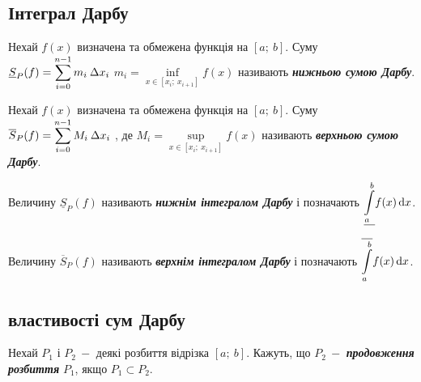 \subsection{\large{Інтеграл Дарбу}}


\begin{definition}
    Нехай $f(x)$ визначена та обмежена функція на $[a;\:b].$ \newline Суму $\underline{S}_P(f) = \displaystyle\sum\limits_{i=0}^{n-1} m_i\: \Delta x_i$ $m_i = \underset{{x\in [x_i;\: x_{i+1}]}}{\inf} f(x)$ називають \textcolor{NavyBlue}{\textbf{\textit{нижньою сумою Дарбу}}}. \\
\end{definition}


\begin{definition}
    Нехай $f(x)$ визначена та обмежена функція на $[a;\:b].$ \newline
    Суму $\overline{S}_P(f) = \displaystyle\sum\limits_{i=0}^{n-1} M_i\:\Delta x_i$ , де $ M_i = \underset{{x\in [x_i;\: x_{i+1}]}}{\sup} f(x)$ називають \textcolor{NavyBlue}{\textbf{\textit{верхньою сумою Дарбу}}}. \\
\end{definition}


\begin{definition}
    Величину $\underline{S}_P(f)$ називають \textcolor{NavyBlue}{\textbf{\textit{нижнім інтегралом Дарбу}}} і позначають $\underline{\displaystyle\int\limits_a^b} f(x) \,\mathrm{d} x$. \\
\end{definition}


\begin{definition}
    Величину $\overline{S}_P(f)$ називають \textcolor{NavyBlue}{\textbf{\textit{верхнім інтегралом Дарбу}}} і позначають $\overline{\displaystyle\int\limits_a^b} f(x) \,\mathrm{d} x$. \\
\end{definition}


\subsection{\large{властивості сум Дарбу}}

\begin{definition}
    Нехай $P_1$ і $P_2 \: -$ деякі розбиття відрізка $[a;\:b]$. Кажуть, що $P_2\: -$  \textcolor{NavyBlue}{\textbf{\textit{продовження розбиття}}} $P_1$, якщо $P_1 \subset P_2$.
\end{definition}


